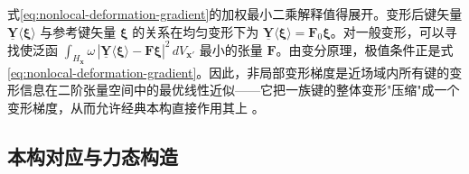 \begin{remark}
  式\eqref{eq:nonlocal-deformation-gradient}的加权最小二乘解释值得展开。变形后键矢量 $\underline{\mathbf{Y}}\langle\boldsymbol{\xi}\rangle$ 与参考键矢量 $\boldsymbol{\xi}$ 的关系在均匀变形下为 $\underline{\mathbf{Y}}\langle\boldsymbol{\xi}\rangle=\mathbf{F}_{0}\boldsymbol{\xi}$。对一般变形，可以寻找使泛函 $\int_{H_{\mathbf{x}}}\omega\,|\underline{\mathbf{Y}}\langle\boldsymbol{\xi}\rangle-\mathbf{F}\boldsymbol{\xi}|^{2}\,dV_{\mathbf{x}'}$ 最小的张量 $\mathbf{F}$。由变分原理，极值条件正是式\eqref{eq:nonlocal-deformation-gradient}。因此，非局部变形梯度是近场域内所有键的变形信息在二阶张量空间中的最优线性近似——它把一族键的整体变形"压缩"成一个变形梯度，从而允许经典本构直接作用其上 \cite{Silling2007}。
\end{remark}

\subsection{本构对应与力态构造}\label{sec:correspondence}

